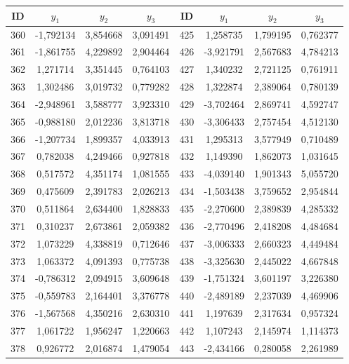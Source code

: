 \begin{apendicesenv}
\begin{table}[H]
	\centering
	\scriptsize
	\begin{tabular}{c c c c c c c c}
		\toprule
		 \centering \textbf{ID} & $y_1$ & $y_2$ & $y_3$ & \textbf{ID} & $y_1$ & $y_2$ & $y_3$ \\
		\midrule
		360 & -1,792134 & 3,854668 & 3,091491 & 425 & 1,258735 & 1,799195 & 0,762377 \\
		361 & -1,861755 & 4,229892 & 2,904464 & 426 & -3,921791 & 2,567683 & 4,784213 \\
		362 & 1,271714 & 3,351445 & 0,764103 & 427 & 1,340232 & 2,721125 & 0,761911 \\
		363 & 1,302486 & 3,019732 & 0,779282 & 428 & 1,322874 & 2,389064 & 0,780139 \\
		364 & -2,948961 & 3,588777 & 3,923310 & 429 & -3,702464 & 2,869741 & 4,592747 \\
		365 & -0,988180 & 2,012236 & 3,813718 & 430 & -3,306433 & 2,757454 & 4,512130 \\
		366 & -1,207734 & 1,899357 & 4,033913 & 431 & 1,295313 & 3,577949 & 0,710489 \\
		367 & 0,782038 & 4,249466 & 0,927818 & 432 & 1,149390 & 1,862073 & 1,031645 \\
		368 & 0,517572 & 4,351174 & 1,081555 & 433 & -4,039140 & 1,901343 & 5,055720 \\
		369 & 0,475609 & 2,391783 & 2,026213 & 434 & -1,503438 & 3,759652 & 2,954844 \\
		370 & 0,511864 & 2,634400 & 1,828833 & 435 & -2,270600 & 2,389839 & 4,285332 \\
		371 & 0,310237 & 2,673861 & 2,059382 & 436 & -2,770496 & 2,418208 & 4,484684 \\
		372 & 1,073229 & 4,338819 & 0,712646 & 437 & -3,006333 & 2,660323 & 4,449484 \\
		373 & 1,063372 & 4,091393 & 0,775738 & 438 & -3,325630 & 2,445022 & 4,667848 \\
		374 & -0,786312 & 2,094915 & 3,609648 & 439 & -1,751324 & 3,601197 & 3,226380 \\
		375 & -0,559783 & 2,164401 & 3,376778 & 440 & -2,489189 & 2,237039 & 4,469906 \\
		376 & -1,567568 & 4,350216 & 2,630310 & 441 & 1,197639 & 2,317634 & 0,957324 \\
		377 & 1,061722 & 1,956247 & 1,220663 & 442 & 1,107243 & 2,145974 & 1,114373 \\
		378 & 0,926772 & 2,016874 & 1,479054 & 443 & -2,434166 & 0,280058 & 2,261989 \\

\end{tabular}
\end{table}
\end{apendicesenv}
